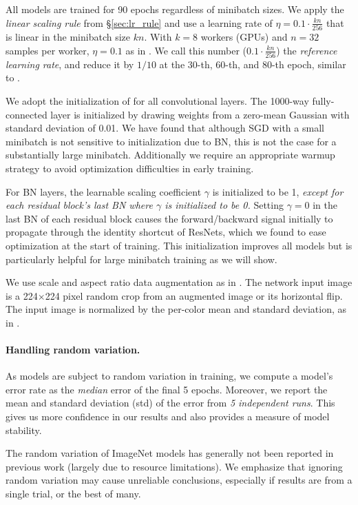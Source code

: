 \documentclass[10pt,twocolumn,letterpaper]{article}
\def\x{\times}
\begin{document}
All models are trained for 90 epochs regardless of minibatch sizes. We apply the \emph{linear scaling rule} from \S\ref{sec:lr_rule} and use a learning rate of $\eta=0.1\cdot\frac{kn}{256}$ that is linear in the minibatch size $kn$. With $k=8$ workers (GPUs) and $n=32$ samples per worker, $\eta=0.1$ as in \cite{He2016}. We call this number ($0.1\cdot\frac{kn}{256}$) the \emph{reference learning rate}, and reduce it by $1/10$ at the 30-th, 60-th, and 80-th epoch, similar to \cite{He2016}.

We adopt the initialization of \cite{He2015} for all convolutional layers. The 1000-way fully-connected layer is initialized by drawing weights from a zero-mean Gaussian with standard deviation of 0.01. We have found that although SGD with a small minibatch is not sensitive to initialization due to BN, this is not the case for a substantially large minibatch. Additionally we require an appropriate warmup strategy to avoid optimization difficulties in early training.

For BN layers, the learnable scaling coefficient $\gamma$ is initialized to be 1, \emph{except for each residual block's last BN where $\gamma$ is initialized to be 0.} Setting $\gamma=0$ in the last BN of each residual block causes the forward/backward signal initially to propagate through the identity shortcut of ResNets, which we found to ease optimization at the start of training. This initialization improves all models but is particularly helpful for large minibatch training as we will show.

We use scale and aspect ratio data augmentation \cite{Szegedy2015} as in \cite{Gross2016}. The network input image is a 224$\x$224 pixel random crop from an augmented image or its horizontal flip. The input image is normalized by the per-color mean and  standard deviation, as in \cite{Gross2016}.

\paragraph{Handling random variation.} As models are subject to random variation in training, we compute a model's error rate as the \emph{median} error of the final 5 epochs. Moreover, we report the mean and standard deviation (std) of the error from \emph{5 independent runs}. This gives us more confidence in our results and also provides a measure of model stability.

The random variation of ImageNet models has generally not been reported in previous work (largely due to resource limitations). We emphasize that ignoring random variation may cause unreliable conclusions, especially if results are from a single trial, or the best of many.
\end{document}
